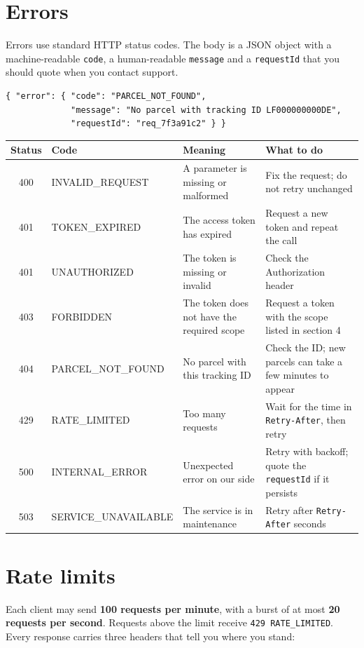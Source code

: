 \documentclass[10pt,a4paper]{article}
\newcommand{\code}[1]{\texttt{#1}}
\begin{document}
\section{Errors}
Errors use standard HTTP status codes. The body is a JSON object with a machine-readable \code{code}, a human-readable
\code{message} and a \code{requestId} that you should quote when you contact support.

\begin{lstlisting}
{ "error": { "code": "PARCEL_NOT_FOUND",
             "message": "No parcel with tracking ID LF000000000DE",
             "requestId": "req_7f3a91c2" } }
\end{lstlisting}

\begin{center}
\small
{}
\begin{tabularx}{\linewidth}{@{}c >{\ttfamily\small}l >{\raggedright\arraybackslash}X >{\raggedright\arraybackslash}X@{}}
  \toprule
  \textbf{Status} & \textbf{Code} & \textbf{Meaning} & \textbf{What to do} \\
  \midrule
  400 & INVALID\_REQUEST & A parameter is missing or malformed & Fix the request; do not retry unchanged \\
  401 & TOKEN\_EXPIRED & The access token has expired & Request a new token and repeat the call \\
  401 & UNAUTHORIZED & The token is missing or invalid & Check the Authorization header \\
  403 & FORBIDDEN & The token does not have the required scope & Request a token with the scope listed in section 4 \\
  404 & PARCEL\_NOT\_FOUND & No parcel with this tracking ID & Check the ID; new parcels can take a few minutes to appear \\
  429 & RATE\_LIMITED & Too many requests & Wait for the time in \code{Retry-After}, then retry \\
  500 & INTERNAL\_ERROR & Unexpected error on our side & Retry with backoff; quote the \code{requestId} if it persists \\
  503 & SERVICE\_UNAVAILABLE & The service is in maintenance & Retry after \code{Retry-After} seconds \\
  \bottomrule
\end{tabularx}
\end{center}

\section{Rate limits}
Each client may send \textbf{100 requests per minute}, with a burst of at most \textbf{20 requests per second}.
Requests above the limit receive \code{429 RATE\_LIMITED}. Every response carries three headers that tell you where you stand:
\end{document}

